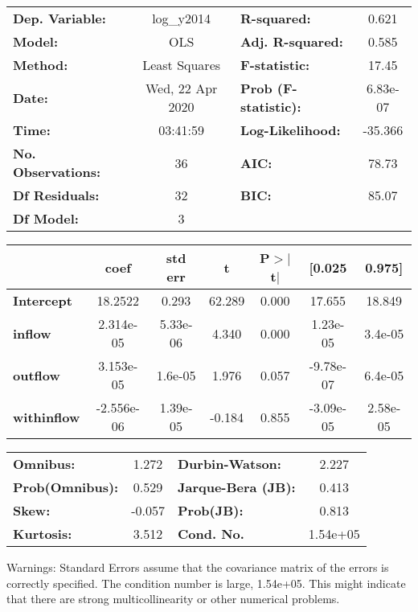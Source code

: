 \begin{center}
\begin{tabular}{lclc}
\toprule
\textbf{Dep. Variable:}    &    log\_y2014    & \textbf{  R-squared:         } &     0.621   \\
\textbf{Model:}            &       OLS        & \textbf{  Adj. R-squared:    } &     0.585   \\
\textbf{Method:}           &  Least Squares   & \textbf{  F-statistic:       } &     17.45   \\
\textbf{Date:}             & Wed, 22 Apr 2020 & \textbf{  Prob (F-statistic):} &  6.83e-07   \\
\textbf{Time:}             &     03:41:59     & \textbf{  Log-Likelihood:    } &   -35.366   \\
\textbf{No. Observations:} &          36      & \textbf{  AIC:               } &     78.73   \\
\textbf{Df Residuals:}     &          32      & \textbf{  BIC:               } &     85.07   \\
\textbf{Df Model:}         &           3      & \textbf{                     } &             \\
\bottomrule
\end{tabular}
\begin{tabular}{lcccccc}
                    & \textbf{coef} & \textbf{std err} & \textbf{t} & \textbf{P$> |$t$|$} & \textbf{[0.025} & \textbf{0.975]}  \\
\midrule
\textbf{Intercept}  &      18.2522  &        0.293     &    62.289  &         0.000        &       17.655    &       18.849     \\
\textbf{inflow}     &    2.314e-05  &     5.33e-06     &     4.340  &         0.000        &     1.23e-05    &      3.4e-05     \\
\textbf{outflow}    &    3.153e-05  &      1.6e-05     &     1.976  &         0.057        &    -9.78e-07    &      6.4e-05     \\
\textbf{withinflow} &   -2.556e-06  &     1.39e-05     &    -0.184  &         0.855        &    -3.09e-05    &     2.58e-05     \\
\bottomrule
\end{tabular}
\begin{tabular}{lclc}
\textbf{Omnibus:}       &  1.272 & \textbf{  Durbin-Watson:     } &    2.227  \\
\textbf{Prob(Omnibus):} &  0.529 & \textbf{  Jarque-Bera (JB):  } &    0.413  \\
\textbf{Skew:}          & -0.057 & \textbf{  Prob(JB):          } &    0.813  \\
\textbf{Kurtosis:}      &  3.512 & \textbf{  Cond. No.          } & 1.54e+05  \\
\bottomrule
\end{tabular}
\end{center}

Warnings: \newline
 [1] Standard Errors assume that the covariance matrix of the errors is correctly specified. \newline
 [2] The condition number is large, 1.54e+05. This might indicate that there are \newline
 strong multicollinearity or other numerical problems.